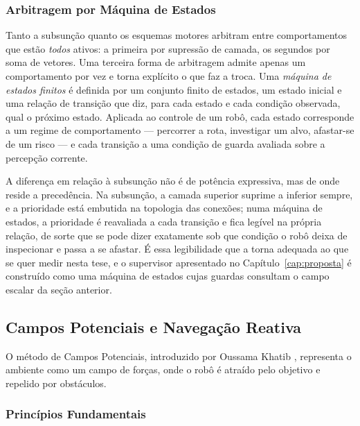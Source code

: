 \subsubsection{Arbitragem por Máquina de Estados}
\label{sec:fund-fsm}

Tanto a subsunção quanto os esquemas motores arbitram entre comportamentos que estão
\emph{todos} ativos: a primeira por supressão de camada, os segundos por soma de vetores.
Uma terceira forma de arbitragem admite apenas um comportamento por vez e torna explícito
o que faz a troca. Uma \emph{máquina de estados finitos} é definida por um conjunto finito
de estados, um estado inicial e uma relação de transição que diz, para cada estado e cada
condição observada, qual o próximo estado. Aplicada ao controle de um robô, cada estado
corresponde a um regime de comportamento --- percorrer a rota, investigar um alvo,
afastar-se de um risco --- e cada transição a uma condição de guarda avaliada sobre a
percepção corrente.

A diferença em relação à subsunção não é de potência expressiva, mas de onde reside a
precedência. Na subsunção, a camada superior suprime a inferior sempre, e a prioridade
está embutida na topologia das conexões; numa máquina de estados, a prioridade é
reavaliada a cada transição e fica legível na própria relação, de sorte que se pode dizer
exatamente sob que condição o robô deixa de inspecionar e passa a se afastar. É essa
legibilidade que a torna adequada ao que se quer medir nesta tese, e o supervisor
apresentado no Capítulo~\ref{cap:proposta} é construído como uma máquina de estados cujas
guardas consultam o campo escalar da seção anterior.

\subsection{Campos Potenciais e Navegação Reativa}

O método de Campos Potenciais, introduzido por Oussama Khatib \cite{Khatib1986}, representa o ambiente como um campo de forças, onde o robô é atraído pelo objetivo e repelido por obstáculos.

\subsubsection{Princípios Fundamentais}

